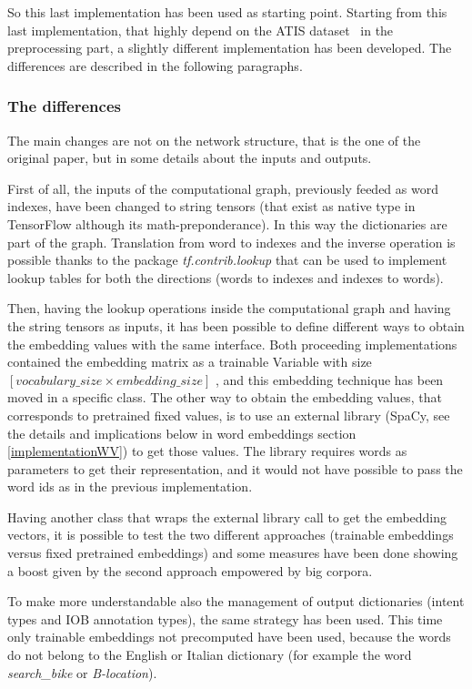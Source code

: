So this last implementation has been used as starting point. Starting from this last implementation, that highly depend on the ATIS dataset~\cite{hemphill1990atis} in the preprocessing part, a slightly different implementation has been developed. The differences are described in the following paragraphs.

\subsubsection{The differences}
The main changes are not on the network structure, that is the one of the original paper, but in some details about the inputs and outputs.

First of all, the inputs of the computational graph, previously feeded as word indexes, have been changed to string tensors (that exist as native type in TensorFlow although its math-preponderance). In this way the dictionaries are part of the graph. Translation from word to indexes and the inverse operation is possible thanks to the package \textit{tf.contrib.lookup} that can be used to implement lookup tables for both the directions (words to indexes and indexes to words).

Then, having the lookup operations inside the computational graph and having the string tensors as inputs, it has been possible to define different ways to obtain the embedding values with the same interface. Both proceeding implementations contained the embedding matrix as a trainable Variable with size  \(  \left[ vocabulary \_ size  \times  embedding \_ size \right]  \) , and this embedding technique has been moved in a specific class. The other way to obtain the embedding values, that corresponds to pretrained fixed values, is to use an external library (SpaCy, see the details and implications below in word embeddings section \ref{implementationWV}) to get those values. The library requires words as parameters to get their representation, and it would not have possible to pass the word ids as in the previous implementation.

Having another class that wraps the external library call to get the embedding vectors, it is possible to test the two different approaches (trainable embeddings versus fixed pretrained embeddings) and some measures have been done showing a boost given by the second approach empowered by big corpora.

To make more understandable also the management of output dictionaries (intent types and IOB annotation types), the same strategy has been used. This time only trainable embeddings not precomputed have been used, because the words do not belong to the English or Italian dictionary (for example the word \textit{search\_bike} or \textit{B-location}).

